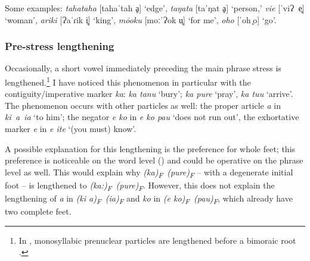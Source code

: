 {\sloppy
Some examples: 
\textit{tahataha} [tahaˈtah%
ḁ] ‘edge’, 
%
\textit{taŋata} [taˈŋat%
ḁ] ‘person,’ 
%
\textit{vi{\ꞌ}e} \mbox{[ˈviɁ%
e̥]} ‘wom\-an’, 
%
\textit{{\ꞌ}ariki} [Ɂaˈɾik%
i̥] ‘king’, 
%
\textit{mō{\ꞌ}oku} [moːˈɁok%
u̥] ‘for me’, 
%
\textit{oho} \mbox{[ˈoh%
̥o]} ‘go’.
}

\subsubsection[Pre{}-stress lengthening]{Pre-stress lengthening}\label{sec:2.5.1.2}
Occasionally, a short vowel immediately preceding the main phrase stress is lengthened.\footnote{\label{fn:62}In , monosyllabic prenuclear particles are lengthened before a bimoraic root \citep{Davletshin2016}.} I have noticed this phenomenon 
in particular with the contiguity/imperative marker \textit{ka}: \textit{ka tanu} \textstyleIPA{[kaːˈtanu]} ‘bury’; \textit{ka pure} \textstyleIPA{[kaːˈpure]} ‘pray’, \textit{ka tu{\ꞌ}u} \textstyleIPA{[kaːˈtuɁu]} ‘arrive’. The phenomenon occurs with other particles as well: the proper article \textit{a} in \textit{ki~a~ia} \textstyleIPA{\mbox{[kiaːˈia]}} ‘to him’; the negator \textit{e ko} in \textit{e ko pau} \textstyleIPA{[ekoːˈpau]} ‘does not run out’, the exhortative marker \textit{e} in \textit{e {\ꞌ}ite} \textstyleIPA{[eːˈɁite]} ‘(you must) know’. 

A possible explanation for this lengthening is the preference for whole feet; this preference is noticeable on the word level () and could be operative on the phrase level as well. This would explain why \textit{\textup{(}}\textit{ka}\textit{\textup{)}}\textit{\textsubscript{F}}\textit{~}\textit{\textup{(}}\textit{pure}\textit{\textup{)}}\textit{\textsubscript{F}} – with a degenerate initial foot – is lengthened to \textit{\textup{(}}\textit{ka:}\textit{\textup{)}}\textit{\textsubscript{F}}\textit{~}\textit{\textup{(}}\textit{pure}\textit{\textup{)}}\textit{\textsubscript{F}}. However, this does not explain the lengthening of \textit{a} in \textit{\textup{(}}\textit{ki a}\textit{\textup{)}}\textit{\textsubscript{F}}\textit{~}\textit{\textup{(}}\textit{ia}\textit{\textup{)}}\textit{\textsubscript{F}} and \textit{ko} in \textit{\textup{(}}\textit{e ko}\textit{\textup{)}}\textit{\textsubscript{F}}\textit{~}\textit{\textup{(}}\textit{pau}\textit{\textup{)}}\textit{\textsubscript{F}}, which already have two complete feet.

